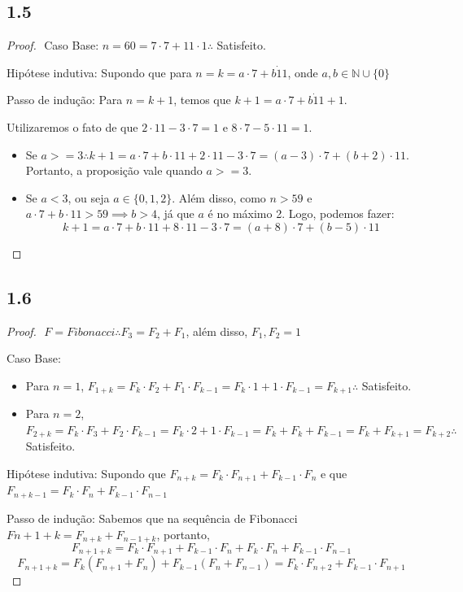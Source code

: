 \documentclass{article}
\begin{document}
\subsection*{1.5}
\begin{proof}
$ $\newline
Caso Base: $n = 60 = 7\cdot7 + 11\cdot1 \therefore$ Satisfeito. 

Hipótese indutiva: Supondo que para $n=k = a\cdot7 + b\dot11$, onde $a,b \in \mathbb{N}\cup\{0\}$

Passo de indução: Para $n = k+1$, temos que $k+1 =a\cdot7 + b\dot11 + 1$.

Utilizaremos o fato de que $2\cdot11-3\cdot7 = 1$ e $8\cdot7 - 5\cdot11 = 1$.

\begin{itemize}

\item Se $a >= 3 \therefore k + 1 =a\cdot7+b\cdot11+2\cdot11-3\cdot7 = (a-3)\cdot7 + (b+2)\cdot11$. Portanto,
a proposição vale quando $a >=3 $.

\item Se $a<3$, ou seja $a \in \{0,1,2\}$. Além disso, como $n > 59$ e $a\cdot7 + b\cdot11 > 59 \implies b > 4$, já que $a$ é no máximo 2.
Logo, podemos fazer:
$$k+1 =a\cdot7+b\cdot11+8\cdot11-3\cdot7 = (a+8)\cdot7 + (b-5)\cdot11 $$

\end{itemize}
\end{proof}

\subsection*{1.6}
\begin{proof}
$ $\newline
$F = Fibonacci \therefore F_3 = F_2 + F_1$, além disso, $F_1,F_2 = 1$

Caso Base:
\begin{itemize}
\item Para $n=1$, $F_{1+k}=F_k\cdot F_2+F_1\cdot F_{k-1}=F_k\cdot1+1\cdot F_{k-1} = F_{k+1} \therefore$ Satisfeito.

\item Para $n=2$, $F_{2+k}=F_k\cdot F_3+F_2\cdot F_{k-1}=F_k\cdot2+1\cdot F_{k-1} = F_k + F_k + F_{k-1} = F_k + F_{k+1} =F_{k+2} \therefore$ Satisfeito.
\end{itemize}

Hipótese indutiva: Supondo que $F_{n+k} = F_k \cdot F_{n+1} + F_{k-1} \cdot F_n$ e que $F_{n+k-1} = F_k \cdot F_{n} + F_{k-1} \cdot F_{n-1}$

Passo de indução: Sabemos que na sequência de Fibonacci $F{n+1+k} = F_{n+k} + F_{n-1+k}$, portanto,
$$F_{n+1+k} = F_k \cdot F_{n+1} + F_{k-1} \cdot F_n + F_k \cdot F_{n} + F_{k-1} \cdot F_{n-1}$$
$$F_{n+1+k} = F_k(F_{n+1}+F_{n})+F_{k-1}(F_n + F_{n-1}) = F_k\cdot F_{n+2}+F_{k-1}\cdot F_{n+1}$$

\end{proof}
\end{document}
